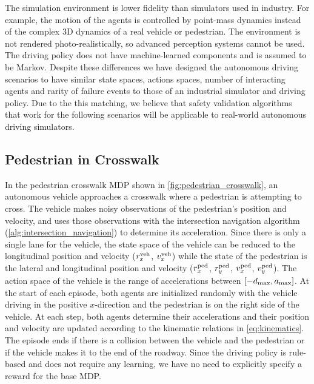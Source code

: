 The simulation environment is lower fidelity than simulators used in industry.  For example, the motion of the agents is controlled by point-mass dynamics instead of the complex 3D dynamics of a real vehicle or pedestrian. The environment is not rendered photo-realistically, so advanced perception systems cannot be used. The driving policy does not have machine-learned components and is assumed to be Markov. Despite these differences we have designed the autonomous driving scenarios to have similar state spaces, actions spaces, number of interacting agents and rarity of failure events to those of an industrial simulator and driving policy. Due to the this matching, we believe that safety validation algorithms that work for the following scenarios will be applicable to real-world autonomous driving simulators.


\subsection{Pedestrian in Crosswalk}
In the pedestrian crosswalk MDP shown in \cref{fig:pedestrian_crosswalk}, an autonomous vehicle approaches a crosswalk where a pedestrian is attempting to cross. The vehicle makes noisy observations of the pedestrian's position and velocity, and uses those observations with the intersection navigation algorithm (\cref{alg:intersection_navigation}) to determine its acceleration. Since there is only a single lane for the vehicle, the state space of the vehicle can be reduced to the longitudinal position and velocity ($r_x^{\rm veh}$, $v_x^{\rm veh}$) while the state of the pedestrian is the lateral and longitudinal position and velocity ($r^{\rm ped}_x$, $r^{\rm ped}_y$, $v^{\rm ped}_x$, $v^{\rm ped}_y$). The action space of the vehicle is the range of accelerations between $[-d_{\rm max}, a_{\rm max}]$. At the start of each episode, both agents are initialized randomly with the vehicle driving in the positive $x$-direction and the pedestrian is on the right side of the vehicle. At each step, both agents determine their accelerations and their position and velocity are updated according to the kinematic relations in \cref{eq:kinematics}. The episode ends if there is a collision between the vehicle and the pedestrian or if the vehicle makes it to the end of the roadway. Since the driving policy is rule-based and does not require any learning, we have no need to explicitly specify a reward for the base MDP. 

